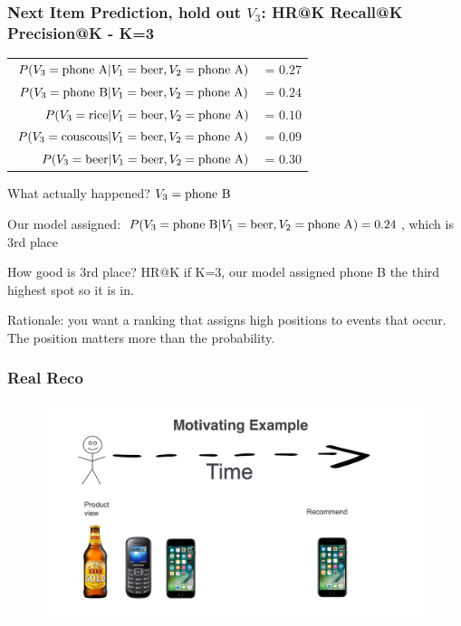  \begin{frame}
  \frametitle{Next Item Prediction, hold out $V_3$: HR@K Recall@K
    Precision@K - K=3}

  \begin{tabular}{r r}
    $P(V_3 = {\rm phone ~ A} | V_1 = {\rm beer}, V_2 = {\rm phone ~ A} )$ &= $0.27$ \\
    $P(V_3 = {\rm phone ~ B} | V_1 = {\rm beer}, V_2 = {\rm phone ~ A} )$ &= $0.24$ \\
    $P(V_3 = {\rm rice} | V_1 = {\rm beer}, V_2 = {\rm phone ~ A} )$ &= $0.10$ \\
    $P(V_3 = {\rm couscous} | V_1 = {\rm beer}, V_2 = {\rm phone ~ A} )$ &= $0.09$ \\
    $P(V_3 = {\rm beer} | V_1 = {\rm beer}, V_2 = {\rm phone ~ A} )$ &= $0.30$ \\
  \end{tabular}

  What actually happened? \pause $V_3 = {\rm phone ~ B} $


  \vspace{4mm}  
  \pause
Our model assigned: $P(V_3 = {\rm phone ~ B} | V_1 = {\rm beer}, V_2 = {\rm phone ~ A}) = 0.24$, which is 3rd place

How good is 3rd place?
\pause
HR@K if K=3, our model assigned phone B the third highest spot so it
is in.

\vspace{4mm}  

\pause
Rationale:  you want a ranking that assigns high positions to events that occur.  The position matters more than the probability.

 \end{frame}







 \begin{frame}
  \frametitle{Real Reco}
 
 
   \begin{figure}[h!]
     \includegraphics[scale=0.25]{images/mot_ex2.png}
       \centering
       \label{motex1}
   \end{figure}
     
 \end{frame}

